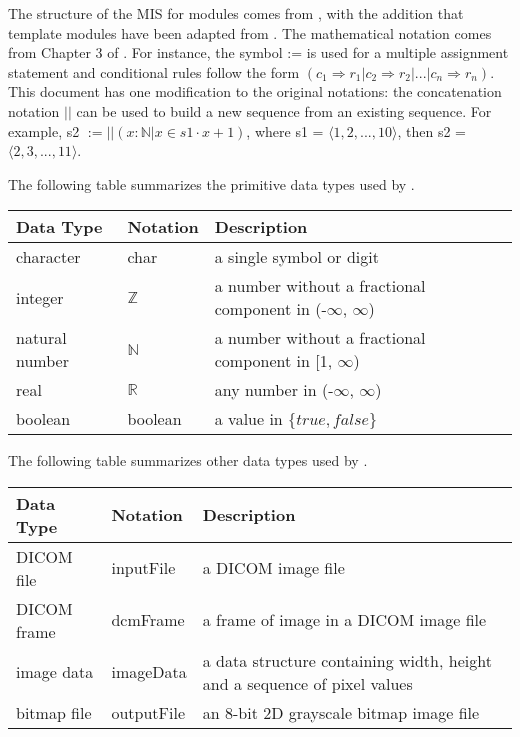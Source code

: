 \documentclass[12pt, titlepage]{article}
\begin{document}
The structure of the MIS for modules comes from \citet{HoffmanAndStrooper1995},
with the addition that template modules have been adapted from
\cite{GhezziEtAl2003}.  The mathematical notation comes from Chapter 3 of
\citet{HoffmanAndStrooper1995}.  For instance, the symbol := is used for a
multiple assignment statement and conditional rules follow the form $(c_1
\Rightarrow r_1 | c_2 \Rightarrow r_2 | ... | c_n \Rightarrow r_n )$. This
document has one modification to the original notations: the concatenation
notation $||$ can be used to build a new sequence from an existing sequence. For
example, s2 $:= ||(x : \mathbb{N} | x \in s1 \cdot x+1)$, where s1 = $\langle
1,2,...,10 \rangle$, then s2 = $\langle 2,3,...,11 \rangle$. 

The following table summarizes the primitive data types used by \progname. 

\begin{center}
\renewcommand{\arraystretch}{1.2}
\noindent 
\begin{tabular}{l l p{7.5cm}} 
\toprule 
\textbf{Data Type} & \textbf{Notation} & \textbf{Description}\\ 
\midrule
character & char & a single symbol or digit\\
integer & $\mathbb{Z}$ & a number without a fractional component in (-$\infty$,
$\infty$) \\
natural number & $\mathbb{N}$ & a number without a fractional component in [1,
$\infty$) \\
real & $\mathbb{R}$ & any number in (-$\infty$, $\infty$)\\
boolean & boolean & a value in $\{true, false\}$\\
\bottomrule
\end{tabular} 
\end{center}

The following table summarizes other data types used by \progname.
\begin{center}
\renewcommand{\arraystretch}{1.2}
\noindent 
\begin{tabular}{l l p{7.5cm}} 
\toprule 
\textbf{Data Type} & \textbf{Notation} & \textbf{Description}\\ 
\midrule
DICOM file & inputFile & a DICOM image file\\
DICOM frame & dcmFrame & a frame of image in a DICOM image file\\
image data & imageData & a data structure containing width, height and a
sequence of pixel values\\
bitmap file & outputFile & an 8-bit 2D grayscale bitmap image file\\
\bottomrule
\end{tabular} 
\end{center}
\end{document}
